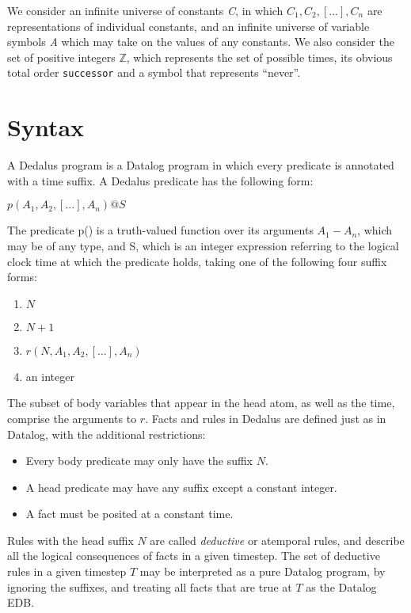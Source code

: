 \documentclass{acm_proc_article-sp-sigmod09}
\newcommand{\dedalus}[1]{\texttt{\fontsize{9pt}{9pt}\selectfont #1}}
\begin{document}
We consider an infinite universe of constants \emph{C}, in which
$C_{1}, C_{2}, [...], C_{n}$ are representations of individual constants, and
an infinite universe of variable symbols \emph{A} which may take on the values
of any constants.   We also consider the set of positive integers $\mathbb{Z}$,
which represents the set of possible times, its obvious total order
\dedalus{successor} and a symbol that represents ``never''.

\section{Syntax}

A Dedalus program is a Datalog program in which every predicate is annotated with a time suffix.  A Dedalus predicate has the following form:

$p(A_{1}, A_{2}, [...], A_{n})@S$

The predicate p() is a truth-valued function over its arguments $A_{1} - A_{n}$, which may be of any type, and S, which is an integer expression 
referring to the logical clock time at which the predicate holds, taking one of the following four suffix forms:

\begin{enumerate}
\item $N$
\item $N + 1$
\item $r(N, A_{1}, A_{2}, [...], A_{n})$
\item an integer
\end{enumerate}

The subset of body variables that appear in the head atom, as well as the time,
comprise the arguments to $r$.  Facts and rules in Dedalus are 
defined just as in Datalog, with the additional restrictions:

\begin{itemize}
\item Every body predicate may only have the suffix $N$.
\item A head predicate may have any suffix except a constant integer.
\item A fact must be posited at a constant time.
\end{itemize}

Rules with the head suffix $N$ are called \emph{deductive} or atemporal rules,
and describe all the logical consequences of facts in a given timestep.  The
set of deductive rules in a given timestep $T$ may be interpreted as a pure
Datalog program, by ignoring the suffixes, and treating all facts that are true
at $T$ as the Datalog EDB.
\end{document}
